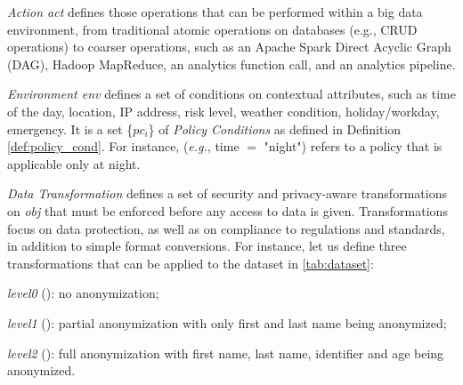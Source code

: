       \textit{Action act} defines those operations that can be performed within a big data environment, from traditional atomic operations on databases (e.g., CRUD operations) to coarser operations, such as an Apache Spark Direct Acyclic Graph (DAG), Hadoop MapReduce, an analytics function call, and an analytics pipeline.

      \textit{Environment env} defines a set of conditions on contextual attributes, such as time of the day, location, IP address, risk level, weather condition, holiday/workday, emergency. It is a set \{$pc_i$\} of \emph{Policy Conditions} as defined in Definition \ref{def:policy_cond}. For instance, (\textit{e.g.}, time $=$ "night") refers to a policy that is applicable only at night.

      \textit{Data Transformation \TP} defines a set of security and privacy-aware transformations on \textit{obj} that must be enforced before any access to data is given. Transformations focus on data protection, as well as on compliance to regulations and standards, in addition to simple format conversions. For instance, let us define three transformations that can be applied to the dataset in \cref{tab:dataset}:
      \begin{enumerate*}[label=\roman*)]
        \item \emph{level0} (): no anonymization;
        \item \emph{level1} (): partial anonymization with only first and last name being anonymized;
        \item \emph{level2} (): full anonymization with first name, last name, identifier and age being anonymized.
      \end{enumerate*}


